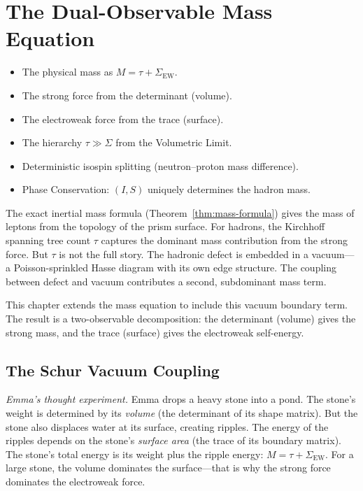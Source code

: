 \documentclass[11pt, a4paper, openany]{book}
\newcounter{thm}[chapter]
\newenvironment{introduction}[1][Modulo Overview]{%
  \begin{tcolorbox}[
    enhanced,colback=structure!5,colframe=structure,
    colbacktitle=structure,coltitle=white,
    fonttitle=\small\bfseries,title={#1},
    arc=2pt,boxrule=0.7pt,
    left=8pt,right=8pt,top=6pt,bottom=6pt,
    before skip=12pt,after skip=12pt
  ]\itshape\begin{itemize}[leftmargin=*,itemsep=2pt,parsep=0pt]
}{%
  \end{itemize}\end{tcolorbox}
}
\begin{document}
\chapter{The Dual-Observable Mass Equation}\label{ch:dual-mass}

\begin{introduction}
  \item The physical mass as $M = \tau + \Sigma_{\mathrm{EW}}$.
  \item The strong force from the determinant (volume).
  \item The electroweak force from the trace (surface).
  \item The hierarchy $\tau \gg \Sigma$ from the Volumetric Limit.
  \item Deterministic isospin splitting (neutron--proton mass difference).
  \item Phase Conservation: $(I, S)$ uniquely determines the hadron mass.
\end{introduction}

\noindent
The exact inertial mass formula (Theorem~\ref{thm:mass-formula}) gives
the mass of leptons from the topology of the prism surface.  For
hadrons, the Kirchhoff spanning tree count $\tau$ captures the dominant
mass contribution from the strong force.  But $\tau$ is not the full
story.  The hadronic defect is embedded in a vacuum---a
Poisson-sprinkled Hasse diagram with its own edge structure.  The coupling
between defect and vacuum contributes a second, subdominant mass term.

This chapter extends the mass equation to include this vacuum boundary
term.  The result is a two-observable decomposition: the determinant
(volume) gives the strong mass, and the trace (surface) gives the
electroweak self-energy.

\section{The Schur Vacuum Coupling}

\smallskip\noindent
\textit{Emma's thought experiment.}
Emma drops a heavy stone into a pond.  The stone's weight is determined
by its \emph{volume} (the determinant of its shape matrix).  But the
stone also displaces water at its surface, creating ripples.  The energy
of the ripples depends on the stone's \emph{surface area} (the trace of
its boundary matrix).  The stone's total energy is its weight plus the
ripple energy: $M = \tau + \Sigma_{\mathrm{EW}}$.  For a large stone,
the volume dominates the surface---that is why the strong force
dominates the electroweak force.
\smallskip
\end{document}
